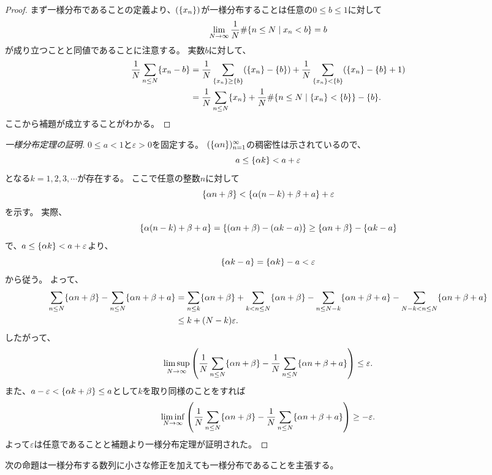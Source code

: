 \begin{proof}
まず一様分布であることの定義より、$(\{x_n\})$が一様分布することは任意の$0 \le b \le 1$に対して
$$
\lim_{N \to \infty}\frac{1}{N}\#\{ n \le N \mid x_n < b \} = b
$$
が成り立つことと同値であることに注意する。
実数$b$に対して、
$$
\begin{aligned}
\frac{1}{N}\sum_{n \le N}\{x_n-b\}
&= \frac{1}{N}\sum_{\{x_n\} \ge \{b\}}(\{x_n\}-\{b\})+\frac{1}{N}\sum_{\{x_n\} < \{b\}}(\{x_n\}-\{b\}+1) \\
&= \frac{1}{N}\sum_{n \le N}\{x_n\}+\frac{1}{N}\#\{ n \le N \mid \{x_n\} < \{b\} \}-\{b\}.
\end{aligned}
$$
ここから補題が成立することがわかる。
\end{proof}

\begin{proof}[一様分布定理の証明]
$0 \le a < 1$と$\varepsilon > 0$を固定する。
$(\{\alpha n\})_{n = 1}^\infty$の稠密性は示されているので、
$$
a \le \{\alpha k\} < a+\varepsilon
$$
となる$k = 1, 2, 3, \cdots$が存在する。
ここで任意の整数$n$に対して
$$
\{\alpha n+\beta\} < \{\alpha(n-k)+\beta+a\}+\varepsilon
$$
を示す。
実際、
$$
\{\alpha(n-k)+\beta+a\} = \{(\alpha n+\beta)-(\alpha k-a)\} \ge \{\alpha n+\beta\}-\{\alpha k-a\}
$$
で、$a \le \{\alpha k\} < a+\varepsilon$より、
$$
\{\alpha k-a\} = \{\alpha k\}-a < \varepsilon
$$
から従う。
よって、
$$
\begin{aligned}
\sum_{n \le N}\{\alpha n+\beta\}-\sum_{n \le N}\{\alpha n+\beta+a\}
&= \sum_{n \le k}\{\alpha n+\beta\}+\sum_{k < n \le N}\{\alpha n+\beta\}-\sum_{n \le N-k}\{\alpha n+\beta+a\}-\sum_{N-k < n \le N}\{\alpha n+\beta+a\} \\
&\le k+(N-k)\varepsilon.
\end{aligned}
$$
したがって、
$$
\limsup_{N \to \infty}\qty(\frac{1}{N}\sum_{n \le N}\{\alpha n+\beta\}-\frac{1}{N}\sum_{n \le N}\{\alpha n+\beta+a\}) \le \varepsilon.
$$
また、$a-\varepsilon < \{\alpha k+\beta\} \le a$として$k$を取り同様のことをすれば
$$
\liminf_{N \to \infty}\qty(\frac{1}{N}\sum_{n \le N}\{\alpha n+\beta\}-\frac{1}{N}\sum_{n \le N}\{\alpha n+\beta+a\}) \ge -\varepsilon.
$$
よって$\varepsilon$は任意であることと補題より一様分布定理が証明された。
\end{proof}

次の命題は一様分布する数列に小さな修正を加えても一様分布であることを主張する。

